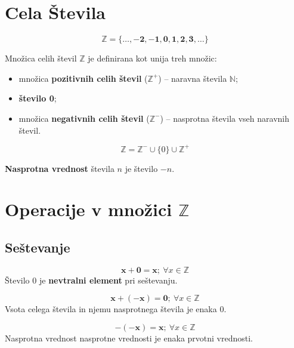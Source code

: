 \newpage
   \section{Cela Števila}
         
                    $$\mathbf{\mathbb{Z} = \{\ldots, -2, -1, 0, 1, 2, 3, \ldots\}}$$
                

                 
                    Množica celih števil $\mathbb{Z}$ je definirana kot unija treh množic:
                        \begin{itemize}
                            \item množica \textbf{pozitivnih celih števil} ($\mathbb{Z}^+$) -- naravna števila $\mathbb{N}$;
                            \item \textbf{število 0};
                            \item množica \textbf{negativnih celih števil} ($\mathbb{Z}^-$) -- nasprotna števila vseh naravnih števil.
                        \end{itemize}
                      $$\mathbb{Z} = \mathbb{Z}^- \cup \{0\} \cup \mathbb{Z}^+$$

                 

                 
                    \textbf{Nasprotna vrednost} števila $n$ je število $-n$.
                 
         

         
             \section{Operacije v množici $\mathbb{Z}$}

            \subsection{Seštevanje}

             
                $$\mathbf{x+0=x}; ~\forall x\in\mathbb{Z}$$
                Število $0$ je \textbf{nevtralni element} pri seštevanju.
             

             
                $$\mathbf{x+(-x)=0}; ~\forall x\in\mathbb{Z} $$
                Vsota celega števila in njemu nasprotnega števila je enaka $0$.
             

             
                $$\mathbf{-(-x)=x}; ~\forall x\in\mathbb{Z}$$
                Nasprotna vrednost nasprotne vrednosti je enaka prvotni vrednosti.
             \newline
         

